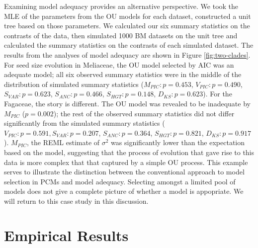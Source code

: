 \documentclass[a4paper,12pt]{article}
\begin{document}
Examining model adequacy provides an alternative perspective. We took the MLE of the parameters from the OU models for each dataset, constructed a unit tree based on those parameters. We calculated our six summary statistics on the contrasts of the data, then simulated 1000 BM datasets on the unit tree and calculated the summary statistics on the contrasts of each simulated dataset. The results from the analyses of model adequacy are shown in Figure \ref{fig:two-clades}. For seed size evolution in Meliaceae, the OU model selected by AIC was an adequate model; all six observed summary statistics were in the middle of the distribution of simulated summary statistics ($M_{PIC}: p=0.453$, $V_{PIC}: p=0.490$, $S_{VAR}: p=0.623$, $S_{ANC}:p=0.466$, $S_{HGT}: p=0.148$, $D_{KS}: p=0.623$). For the Fagaceae, the story is different. The OU model was revealed to be inadequate by $M_{PIC}$ ($p=0.002$); the rest of the observed summary statistics did not differ significantly from the simulated summary statistics ($V_{PIC}:p=0.591, S_{VAR}: p=0.207$, $S_{ANC}:p=0.364$, $S_{HGT}: p=0.821$, $D_{KS}: p=0.917$). $M_{PIC}$, the REML estimate of $\sigma^2$ was significantly lower than the expectation based on the model, suggesting that the process of evolution that gave rise to this data is more complex that that captured by a simple OU process. This example serves to illustrate the distinction between the conventional approach to model selection in PCMs and model adequacy. Selecting amongst a limited pool of models does not give a complete picture of whether a model is appopriate. We will return to this case study in this discussion.


\section{Empirical Results}
\end{document}
